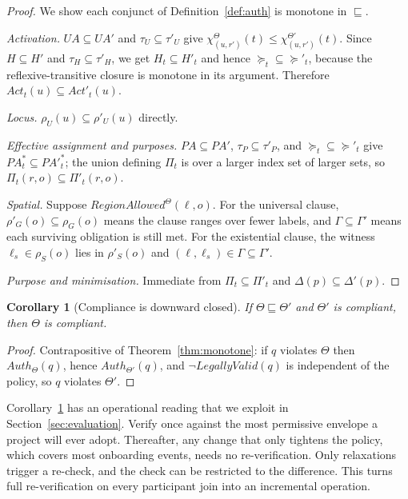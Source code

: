 \documentclass[11pt]{article}
\theoremstyle{definition}
\theoremstyle{plain}
\newtheorem{corollary}[theorem]{Corollary}
\theoremstyle{remark}
\newcommand{\Auth}{\mathit{Auth}}
\newcommand{\RegionOK}{\mathit{RegionAllowed}}
\newcommand{\LegalOK}{\mathit{LegallyValid}}
\newcommand{\Act}{\mathit{Act}}
\begin{document}
\begin{proof}
We show each conjunct of Definition~\ref{def:auth} is monotone in
$\sqsubseteq$.

\emph{Activation.} $UA \subseteq UA'$ and $\tau_U \subseteq \tau'_U$ give
$\chi^{\Theta}_{(u,r')}(t) \le \chi^{\Theta'}_{(u,r')}(t)$. Since
$H \subseteq H'$ and $\tau_H \subseteq \tau'_H$, we get
$H_t \subseteq H'_t$ and hence ${\succeq_t} \subseteq {\succeq'_t}$, because the
reflexive-transitive closure is monotone in its argument. Therefore
$\Act_t(u) \subseteq \Act'_t(u)$.

\emph{Locus.} $\rho_U(u) \subseteq \rho'_U(u)$ directly.

\emph{Effective assignment and purposes.} $PA \subseteq PA'$,
$\tau_P \subseteq \tau'_P$, and ${\succeq_t} \subseteq {\succeq'_t}$ give
$PA^{*}_t \subseteq PA'^{*}_t$; the union defining $\Pi_t$ is over a larger
index set of larger sets, so $\Pi_t(r,o) \subseteq \Pi'_t(r,o)$.

\emph{Spatial.} Suppose $\RegionOK^{\Theta}(\ell,o)$. For the universal clause,
$\rho'_G(o) \subseteq \rho_G(o)$ means the clause ranges over fewer labels, and
$\Gamma \subseteq \Gamma'$ means each surviving obligation is still met. For the
existential clause, the witness $\ell_s \in \rho_S(o)$ lies in
$\rho'_S(o)$ and $(\ell,\ell_s) \in \Gamma \subseteq \Gamma'$.

\emph{Purpose and minimisation.} Immediate from
$\Pi_t \subseteq \Pi'_t$ and $\Delta(p) \subseteq \Delta'(p)$.
\end{proof}

\begin{corollary}[Compliance is downward closed]
\label{cor:downward}
If $\Theta \sqsubseteq \Theta'$ and $\Theta'$ is compliant, then $\Theta$ is
compliant.
\end{corollary}

\begin{proof}
Contrapositive of Theorem~\ref{thm:monotone}: if $q$ violates $\Theta$ then
$\Auth_\Theta(q)$, hence $\Auth_{\Theta'}(q)$, and $\neg\LegalOK(q)$ is
independent of the policy, so $q$ violates $\Theta'$.
\end{proof}

Corollary~\ref{cor:downward} has an operational reading that we exploit in
Section~\ref{sec:evaluation}. Verify once against the most permissive envelope
a project will ever adopt. Thereafter, any change that only tightens the policy,
which covers most onboarding events, needs no re-verification. Only relaxations
trigger a re-check, and the check can be restricted to the difference. This
turns full re-verification on every participant join into an incremental
operation.
\end{document}
